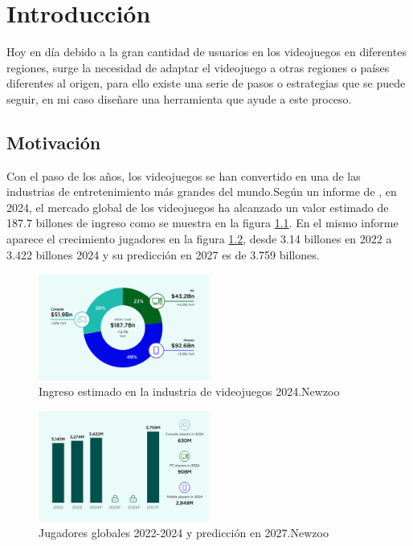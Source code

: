 \chapter{Introducción}
\label{cap:introduccion}
Hoy en día debido a la gran cantidad de usuarios en los videojuegos en diferentes regiones, surge la necesidad de adaptar el videojuego a otras regiones o países diferentes al origen, para ello existe una serie de pasos o estrategias que se puede seguir, en mi caso diseñare una herramienta que ayude a este proceso.
\section{Motivación}
Con el paso de los años, los videojuegos se han convertido en una de las industrias de entretenimiento más grandes del mundo.Según un informe de \cite{NZIngreso2024}, en 2024, el mercado global de los videojuegos ha alcanzado un valor estimado de 187.7 billones de ingreso como se muestra en la figura \ref{fig:NewZooRevenues}. En el mismo informe aparece el crecimiento jugadores en la figura \ref{fig:NewzooPlayers}, desde 3.14 billones en 2022 a 3.422 billones 2024 y su predicción en 2027 es de 3.759 billones.
\begin{figure}[H]
	\centering
	\includegraphics[width = 0.5\textwidth]{Imagenes/Newzoo_2024_Revenues.png}
	\caption{Ingreso estimado en la industria de videojuegos 2024.Newzoo}
	\label{fig:NewZooRevenues}
\end{figure}

\begin{figure}[H]
	\centering
	\includegraphics[width = 0.5\textwidth]{Imagenes/Newzoo_Players.png}
	\caption{Jugadores globales 2022-2024 y predicción en 2027.Newzoo}
	\label{fig:NewzooPlayers}
\end{figure}

